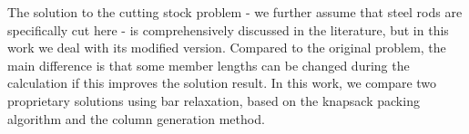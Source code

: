 The solution to the cutting stock problem - we further assume that steel rods are specifically cut here - is comprehensively discussed in the literature, but in this work we deal with its modified version. Compared to the original problem, the main difference is that some member lengths can be changed during the calculation if this improves the solution result. In this work, we compare two proprietary solutions using bar relaxation, based on the knapsack packing algorithm and the column generation method.